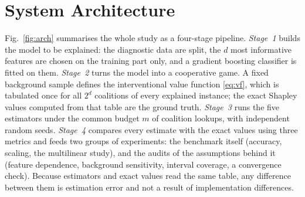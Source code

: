 \documentclass[conference]{IEEEtran}
\begin{document}
\section{System Architecture}
\label{sec:arch}
Fig.~\ref{fig:arch} summarises the whole study as a four-stage pipeline. \emph{Stage~1} builds the model to be explained: the diagnostic data are split, the $d$ most informative features are chosen on the training part only, and a gradient boosting classifier is fitted on them. \emph{Stage~2} turns the model into a cooperative game. A fixed background sample defines the interventional value function \eqref{eq:vf}, which is tabulated once for all $2^d$ coalitions of every explained instance; the exact Shapley values computed from that table are the ground truth. \emph{Stage~3} runs the five estimators under the common budget $m$ of coalition lookups, with independent random seeds. \emph{Stage~4} compares every estimate with the exact values using three metrics and feeds two groups of experiments: the benchmark itself (accuracy, scaling, the multilinear study), and the audits of the assumptions behind it (feature dependence, background sensitivity, interval coverage, a convergence check). Because estimators and exact values read the same table, any difference between them is estimation error and not a result of implementation differences.
\end{document}
